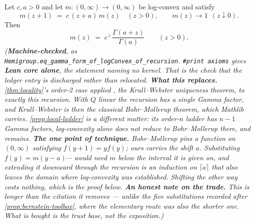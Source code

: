 \begin{lemma}
\label{lem:gamma-recursion-uniqueness}
\leanok
Let $c, a > 0$ and let $m : (0,\infty) \to (0,\infty)$ be log-convex and satisfy
\[
  m(z+1) \;=\; c\,(z + a)\,m(z) \quad (z > 0),
  \qquad m(z) \to 1 \ \ (z \downarrow 0).
\]
Then
\[
  m(z) \;=\; c^{\,z}\,\frac{\Gamma(a + z)}{\Gamma(a)} \qquad (z > 0).
\]
\statusT\quad\emph{(\textbf{Machine-checked}, as
\texttt{Hemigroup.eq\_gamma\_form\_of\_logConvex\_of\_recursion}. \texttt{\#print axioms} gives
\textbf{Lean core alone}, the statement naming no kernel. That is the check
that the ledger entry is discharged rather than relocated.
\textbf{What this replaces.} \ref{thm:locality}'s order-2 case applied , the
Krull--Webster uniqueness theorem, to exactly this recursion. With $Q$ linear the recursion has a
single Gamma factor, and Krull--Webster is then the classical Bohr--Mollerup theorem, which
Mathlib carries. \ref{prop:local-ladder} is a different matter: its order-$n$ ladder has $n-1$
Gamma factors, log-convexity alone does not reduce to Bohr--Mollerup there, and 
remains.
\textbf{The one point of technique.} Bohr--Mollerup pins a function on $(0,\infty)$ satisfying
$f(y+1) = y f(y)$; ours carries the shift $a$. Substituting $f(y) = m(y-a)\cdots$ would need $m$
below the interval it is given on, and extending it downward through the recursion is an
induction on $\lceil a \rceil$ that also leaves the domain where log-convexity was established.
Shifting the other way costs nothing, which is the proof below.
\textbf{An honest note on the trade.} This is \emph{longer} than the citation it removes ---
unlike the five substitutions recorded after \ref{prop:bernstein-toolbox}, where the elementary
route was also the shorter one. What is bought is the trust base, not the exposition.)}
\end{lemma}

